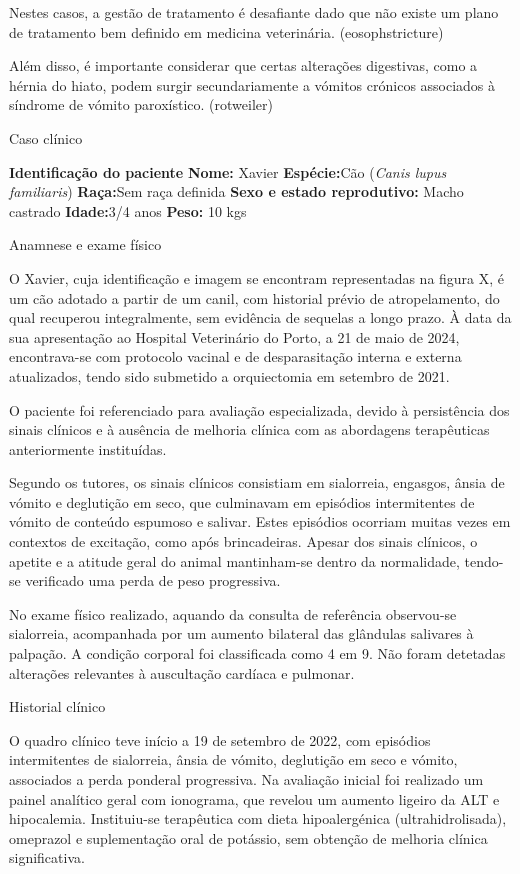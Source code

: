 Nestes casos, a gestão de tratamento é desafiante dado que não existe um plano de tratamento bem definido em medicina veterinária. (eosophstricture)


Além disso, é importante considerar que certas alterações digestivas, como a hérnia do hiato, podem surgir secundariamente a vómitos crónicos associados à síndrome de vómito paroxístico. (rotweiler)


Caso clínico


\textbf{Identificação do paciente}
\textbf{Nome:} Xavier
\textbf{Espécie:}Cão (\textit{Canis lupus familiaris})
\textbf{Raça:}Sem raça definida
\textbf{Sexo e estado reprodutivo:} Macho castrado
\textbf{Idade:}3/4 anos
\textbf{Peso:} 10 kgs

Anamnese e exame físico

O Xavier, cuja identificação e imagem se encontram representadas na figura X, é um cão adotado a partir de um canil, com historial prévio de atropelamento, do qual recuperou integralmente, sem evidência de sequelas a longo prazo. À data da sua apresentação ao Hospital Veterinário do Porto, a 21 de maio de 2024, encontrava-se com protocolo vacinal e de desparasitação interna e externa atualizados, tendo sido submetido a orquiectomia em setembro de 2021. 


O paciente foi referenciado para avaliação especializada, devido à persistência dos sinais clínicos e à ausência de melhoria clínica com as abordagens terapêuticas anteriormente instituídas.


Segundo os tutores, os sinais clínicos consistiam em sialorreia, engasgos, ânsia de vómito e deglutição em seco, que culminavam em episódios intermitentes de vómito de conteúdo espumoso e salivar. Estes episódios ocorriam muitas vezes em contextos de excitação, como após brincadeiras. Apesar dos sinais clínicos, o apetite e a atitude geral do animal mantinham-se dentro da normalidade, tendo-se verificado uma perda de peso progressiva.


No exame físico realizado, aquando da consulta de referência observou-se sialorreia, acompanhada por um aumento bilateral das glândulas salivares à palpação. A condição corporal foi classificada como 4 em 9. Não foram detetadas alterações relevantes à auscultação cardíaca e pulmonar.

Historial clínico


O quadro clínico teve início a 19 de setembro de 2022, com episódios intermitentes de sialorreia, ânsia de vómito, deglutição em seco e vómito, associados a perda ponderal progressiva. Na avaliação inicial foi realizado um painel analítico geral com ionograma, que revelou um aumento ligeiro da ALT e hipocalemia. Instituiu-se terapêutica com dieta hipoalergénica (ultrahidrolisada), omeprazol e suplementação oral de potássio, sem obtenção de melhoria clínica significativa.


